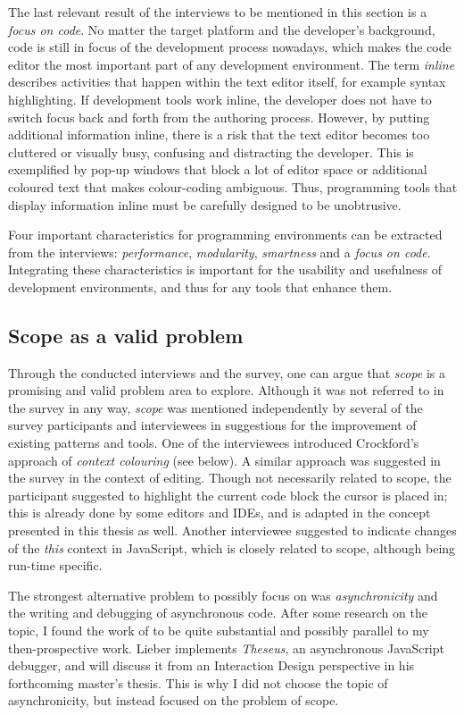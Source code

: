 The last relevant result of the interviews to be mentioned in this
section is a \emph{focus on code}. No matter the target platform and the
developer’s background, code is still in focus of the development
process nowadays, which makes the code editor the most important part of
any development environment. The term \emph{inline} describes activities
that happen within the text editor itself, for example syntax
highlighting. If development tools work inline, the developer does not
have to switch focus back and forth from the authoring process. However,
by putting additional information inline, there is a risk that the text
editor becomes too cluttered or visually busy, confusing and distracting
the developer. This is exemplified by pop-up windows that block a lot of
editor space or additional coloured text that makes colour-coding
ambiguous. Thus, programming tools that display information inline must
be carefully designed to be unobtrusive.

Four important characteristics for programming environments can be
extracted from the interviews: \emph{performance}, \emph{modularity},
\emph{smartness} and a \emph{focus on code}. Integrating these
characteristics is important for the usability and usefulness of
development environments, and thus for any tools that enhance them.

\subsection{Scope as a valid problem}\label{scope-as-a-valid-problem}

Through the conducted interviews and the survey, one can argue that
\emph{scope} is a promising and valid problem area to explore. Although
it was not referred to in the survey in any way, \emph{scope} was
mentioned independently by several of the survey participants and
interviewees in suggestions for the improvement of existing patterns and
tools. One of the interviewees introduced Crockford’s
\citeyear{crockford} approach of \emph{context colouring} (see below). A
similar approach was suggested in the survey in the context of editing.
Though not necessarily related to scope, the participant suggested to
highlight the current code block the cursor is placed in; this is
already done by some editors and IDEs, and is adapted in the concept
presented in this thesis as well. Another interviewee suggested to
indicate changes of the \emph{this} context in JavaScript, which is
closely related to scope, although being run-time specific.

The strongest alternative problem to possibly focus on was
\emph{asynchronicity} and the writing and debugging of asynchronous
code. After some research on the topic, I found the work of
 to be quite substantial and possibly parallel to my
then-prospective work. Lieber implements \emph{Theseus}, an asynchronous
JavaScript debugger, and will discuss it from an Interaction Design
perspective in his forthcoming master’s thesis. This is why I did not
choose the topic of asynchronicity, but instead focused on the problem
of scope.
